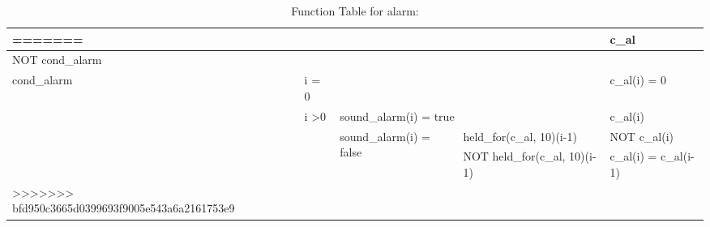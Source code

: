 \documentclass[fontsize=12pt,paper=letter,twoside]{scrartcl}
\begin{document}
\begin{table}[htb!]
\begin{tabular}{llll|l|}
=======
\cline{5-5}                                       &                                       &                                                               &                               & c\_al                 \\ \hline
\multicolumn{5}{|l|}{NOT cond\_alarm \footnotemark                                                                                                                                                                             } \\ \hline
\multicolumn{1}{|l|}{\multirow{4}{*}{cond\_alarm}} & \multicolumn{1}{l|}{i = 0}            & \multicolumn{1}{l|}{}                                         &                               & c\_al(i) = 0          \\ \cline{2-5}
\multicolumn{1}{|l|}{}                             & \multicolumn{1}{l|}{i \textgreater 0} & \multicolumn{2}{l|}{sound\_alarm(i) = true}                                                   & c\_al(i)              \\ \cline{2-5}
\multicolumn{1}{|l|}{}                             & \multicolumn{1}{l|}{}                 & \multicolumn{1}{l|}{\multirow{2}{*}{sound\_alarm(i) = false}} & held\_for(c\_al, 10)(i-1)     & NOT c\_al(i)          \\ \cline{2-2} \cline{4-5}
\multicolumn{1}{|l|}{}                             & \multicolumn{1}{l|}{}                 & \multicolumn{1}{l|}{}                                         & NOT held\_for(c\_al, 10)(i-1) & c\_al(i) = c\_al(i-1) \\ \hline
>>>>>>> bfd950c3665d0399693f9005e543a6a2161753e9
\end{tabular}
\caption{Function Table for alarm: }
\end{table}
\end{document}
